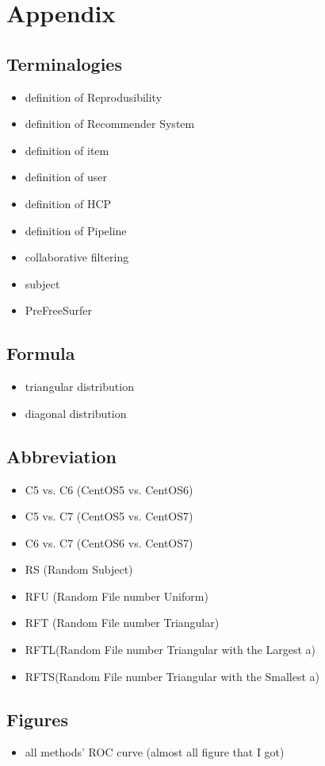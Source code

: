 \chapter{Appendix}
\section{Terminalogies}
\begin{tcolorbox}
	\begin{itemize}
		\item definition of Reprodusibility
		\item definition of Recommender System
		\item definition of item
		\item definition of user
		\item definition of HCP
		\item definition of Pipeline
		\item collaborative filtering
		\item subject
		\item PreFreeSurfer
\end{itemize}
\end{tcolorbox}

\section{Formula}
\begin{tcolorbox}
	\begin{itemize}
		\item triangular distribution
		\item diagonal distribution
\end{itemize}
\end{tcolorbox}

\section{Abbreviation}
\begin{tcolorbox}
	\begin{itemize}
		\item C5 vs. C6 (CentOS5 vs. CentOS6)
		\item C5 vs. C7 (CentOS5 vs. CentOS7)
		\item C6 vs. C7 (CentOS6 vs. CentOS7)
		\item RS (Random Subject)
		\item RFU (Random File number Uniform)
		\item RFT (Random File number Triangular)
		\item RFTL(Random File number Triangular with the Largest a)
		\item RFTS(Random File number Triangular with the Smallest a)
\end{itemize}
\end{tcolorbox}

\section{Figures}
\begin{tcolorbox}
        \begin{itemize}
		\item all methods' ROC curve (almost all figure that I got)
\end{itemize}
\end{tcolorbox}
